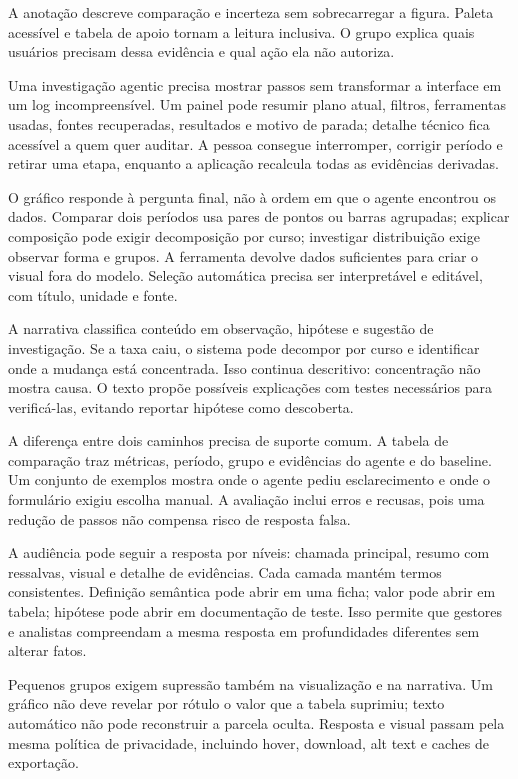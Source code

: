 A anotação descreve comparação e incerteza sem sobrecarregar a figura. Paleta acessível e tabela de apoio tornam a leitura inclusiva. O grupo explica quais usuários precisam dessa evidência e qual ação ela não autoriza.

Uma investigação agentic precisa mostrar passos sem transformar a interface em um log incompreensível. Um painel pode resumir plano atual, filtros, ferramentas usadas, fontes recuperadas, resultados e motivo de parada; detalhe técnico fica acessível a quem quer auditar. A pessoa consegue interromper, corrigir período e retirar uma etapa, enquanto a aplicação recalcula todas as evidências derivadas.

O gráfico responde à pergunta final, não à ordem em que o agente encontrou os dados. Comparar dois períodos usa pares de pontos ou barras agrupadas; explicar composição pode exigir decomposição por curso; investigar distribuição exige observar forma e grupos. A ferramenta devolve dados suficientes para criar o visual fora do modelo. Seleção automática precisa ser interpretável e editável, com título, unidade e fonte.

A narrativa classifica conteúdo em observação, hipótese e sugestão de investigação. Se a taxa caiu, o sistema pode decompor por curso e identificar onde a mudança está concentrada. Isso continua descritivo: concentração não mostra causa. O texto propõe possíveis explicações com testes necessários para verificá-las, evitando reportar hipótese como descoberta.

A diferença entre dois caminhos precisa de suporte comum. A tabela de comparação traz métricas, período, grupo e evidências do agente e do baseline. Um conjunto de exemplos mostra onde o agente pediu esclarecimento e onde o formulário exigiu escolha manual. A avaliação inclui erros e recusas, pois uma redução de passos não compensa risco de resposta falsa.

A audiência pode seguir a resposta por níveis: chamada principal, resumo com ressalvas, visual e detalhe de evidências. Cada camada mantém termos consistentes. Definição semântica pode abrir em uma ficha; valor pode abrir em tabela; hipótese pode abrir em documentação de teste. Isso permite que gestores e analistas compreendam a mesma resposta em profundidades diferentes sem alterar fatos.

Pequenos grupos exigem supressão também na visualização e na narrativa. Um gráfico não deve revelar por rótulo o valor que a tabela suprimiu; texto automático não pode reconstruir a parcela oculta. Resposta e visual passam pela mesma política de privacidade, incluindo hover, download, alt text e caches de exportação.


